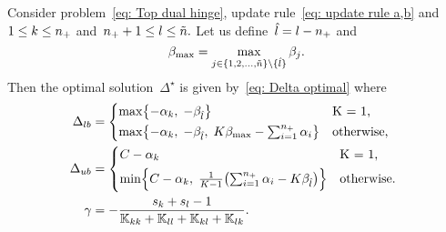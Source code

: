 \begin{lemma}
  Consider problem~\eqref{eq: Top dual hinge}, update rule~\eqref{eq: update rule a,b} and~$1 \leq k \leq n_{+}$ and~$n_{+} + 1 \leq l \leq \tilde{n}.$ Let us define~$\hat{l} = l - n_{+}$ and
  \begin{equation*}
    \beta_{\max} = \max_{j \in \{1, 2, \ldots, \tilde{n} \} \setminus \{\hat{l}\}} \beta_j.
  \end{equation*}
  Then the optimal solution~$\Delta^{\star}$ is given by~\eqref{eq: Delta optimal} where
  \begin{align*}
    \Delta_{lb} & = 
      \begin{cases*}
        \max \Brac[c]{- \alphak, \;  -\betal} & K = 1, \\
        \max \Brac[c]{- \alphak, \;  -\betal, \; K\beta_{\max} - \sum_{i = 1}^{\npos} \alpha_i} & \textrm{otherwise},
      \end{cases*} \\
    \Delta_{ub} & = 
      \begin{cases*}
          C - \alphak & K = 1, \\
          \min \Brac[c]{C - \alphak, \; \frac{1}{K-1}\Brac{\sum_{i = 1}^{\npos} \alpha_i - K \betal}}  & \textrm{otherwise}.
      \end{cases*} \\
    \gamma & = - \frac{s_k + s_l - 1}{\K_{kk} + \K_{ll} + \K_{kl} + \K_{lk}}.
  \end{align*}
\end{lemma}

